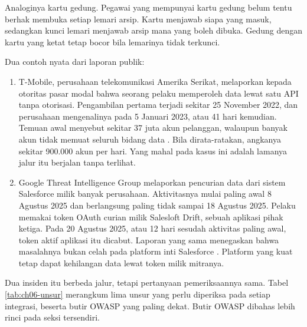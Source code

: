 Analoginya kartu gedung. Pegawai yang mempunyai kartu gedung belum tentu berhak membuka setiap lemari arsip. Kartu
menjawab siapa yang masuk, sedangkan kunci lemari menjawab arsip mana yang boleh dibuka. Gedung dengan kartu yang
ketat tetap bocor bila lemarinya tidak terkunci.

Dua contoh nyata dari laporan publik:
\begin{enumerate}
  \item T-Mobile, perusahaan telekomunikasi Amerika Serikat, melaporkan kepada otoritas pasar modal bahwa seorang
        pelaku memperoleh data lewat satu API tanpa otorisasi. Pengambilan pertama terjadi sekitar 25 November 2022,
        dan perusahaan mengenalinya pada 5 Januari 2023, atau 41 hari kemudian. Temuan awal menyebut sekitar 37 juta
        akun pelanggan, walaupun banyak akun tidak memuat seluruh bidang data \cite{c06-tmobile8k}. Bila
        dirata-ratakan, angkanya sekitar 900.000 akun per hari. Yang mahal pada kasus ini adalah lamanya jalur itu
        berjalan tanpa terlihat.
  \item Google Threat Intelligence Group melaporkan pencurian data dari sistem Salesforce milik banyak perusahaan.
        Aktivitasnya mulai paling awal 8 Agustus 2025 dan berlangsung paling tidak sampai 18 Agustus 2025. Pelaku
        memakai token OAuth curian milik Salesloft Drift, sebuah aplikasi pihak ketiga. Pada 20 Agustus 2025, atau 12
        hari sesudah aktivitas paling awal, token aktif aplikasi itu dicabut. Laporan yang sama menegaskan bahwa
        masalahnya bukan celah pada platform inti Salesforce \cite{c06-gtig-drift}. Platform yang kuat tetap dapat
        kehilangan data lewat token milik mitranya.
\end{enumerate}

Dua insiden itu berbeda jalur, tetapi pertanyaan pemeriksaannya sama. Tabel \ref{tab:ch06-unsur} merangkum lima unsur
yang perlu diperiksa pada setiap integrasi, beserta butir OWASP yang paling dekat. Butir OWASP dibahas lebih rinci
pada seksi tersendiri.

